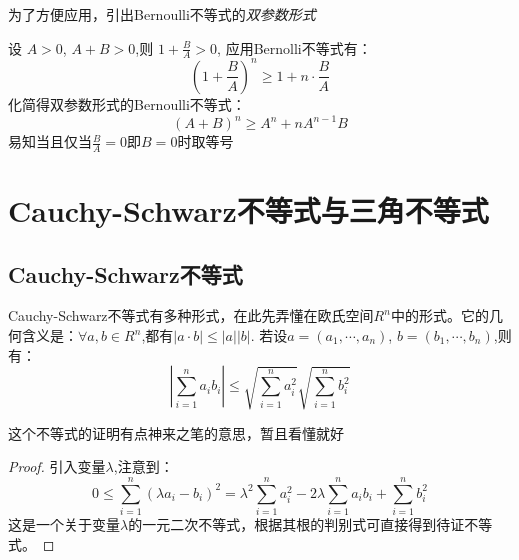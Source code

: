 为了方便应用，引出Bernoulli不等式的\emph{双参数形式}
\begin{proposition}
    设 $ A > 0 $, $ A + B > 0 $,则 $ 1 + \frac{B}{A} > 0$, 应用Bernolli不等式有：
    \begin{equation*}
        \left( 1 + \frac{B}{A} \right)^n \geq 1 + n \cdot \frac{B}{A}
    \end{equation*}
    化简得双参数形式的Bernoulli不等式：
    \begin{equation*}
        (A + B)^n \geq A^n + nA^{n-1}B
    \end{equation*}
    易知当且仅当$\frac{B}{A} = 0$即$B = 0$时取等号
\end{proposition}

\section{Cauchy-Schwarz不等式与三角不等式}
\subsection*{Cauchy-Schwarz不等式}
\begin{proposition}
    Cauchy-Schwarz不等式有多种形式，在此先弄懂在欧氏空间$R^n$中的形式。它的几何含义是：$\forall a, b \in R^n$,都有$|a \cdot b| \leq |a||b|$.
    若设$a = (a_1, \cdots, a_n)$, $b = (b_1, \cdots, b_n)$,则有：
    \begin{equation*}
        \left| \sum_{i=1}^{n}a_ib_i \right| \leq \sqrt{\sum_{i=1}^{n}a_{i}^{2}} \sqrt{\sum_{i=1}^{n}b_{i}^{2}}
    \end{equation*}
\end{proposition}

这个不等式的证明有点神来之笔的意思，暂且看懂就好
\begin{proof}
    引入变量$\lambda$,注意到：
    \begin{equation*}
        0 \leq \sum_{i=1}^{n}(\lambda a_i - b_i)^2  = \lambda^2 \sum_{i=1}^{n}a_i^2 - 2\lambda \sum_{i=1}^{n}a_i b_i 
        + \sum_{i=1}^{n}b_i^2
    \end{equation*}
    这是一个关于变量$\lambda$的一元二次不等式，根据其根的判别式可直接得到待证不等式。
\end{proof}